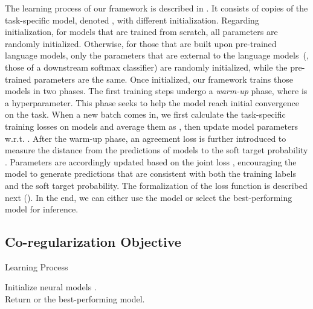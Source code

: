 \documentclass[11pt]{article}
\begin{document}
The learning process of our framework is described in .
It consists of  copies of the task-specific model, denoted , with different initialization.
Regarding initialization,
for models that are trained from scratch, all parameters are randomly initialized.
Otherwise, for those that are built upon pre-trained language models, only the parameters that are external to the language models~(\eg, those of a downstream softmax classifier) are randomly initialized, while the pre-trained parameters are the same.
Once initialized, our framework trains those models in two phases.
The first  training steps undergo a \emph{warm-up} phase, where  is a hyperparameter.
This phase seeks to help the model reach initial convergence on the task.
When a new batch comes in, we first calculate the task-specific training losses on  models  and average them as , then update model parameters w.r.t. .
After the warm-up phase, an agreement loss  is further introduced to measure the distance from the predictions of  models to the soft target probability . 
Parameters are accordingly updated based on the joint loss , encouraging the model to generate predictions that are consistent with both the training labels and the soft target probability.
The formalization of the loss function is described next ().
In the end, we can either use the model  or select the best-performing model for inference.

\subsection{Co-regularization Objective}\label{sec:agreement}

{
\begin{algorithm}[!t]
    \caption{Learning Process}\label{algo::main}
    \normalsize
    Initialize  neural models . \\
    Return  or the best-performing model.
\end{algorithm}
}
\end{document}

